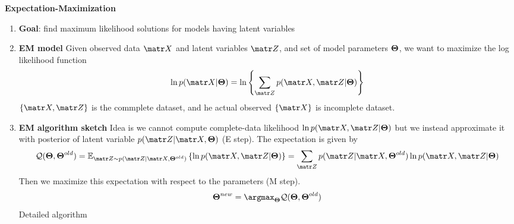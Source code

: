 \documentclass[11pt]{article}
\begin{document}

\begin{defn*}
    \textbf{Expectation-Maximization}
    \begin{enumerate}
        \item \textbf{Goal}: find maximum likelihood solutions for models having latent variables
        \item \textbf{EM model} Given observed data $\bX$ and latent variables $\bZ$, and set of model parameters $\boldsymbol{\Theta}$, we want to maximize the log likelihood function 
        \[
            \ln p(\bX | \bTheta) = 
            \ln \left\{ \sum_{\bZ} p(\bX, \bZ | \bTheta) \right\}    
        \]
        $\{\bX, \bZ\}$ is the commplete dataset, and he actual observed $\{\bX\}$ is incomplete dataset. 
        \item \textbf{EM algorithm sketch} Idea is we cannot compute complete-data likelihood $\ln p(\bX,\bZ | \bTheta)$ but we instead approximate it with posterior of latent variable $p(\bZ | \bX, \bTheta)$ (E step). The expectation is given by 
        \[
            \mathcal{Q}(\bTheta, \bTheta^{old})
            = \E[\bZ \sim p(\bZ | \bX,\bTheta^{old})]{\ln p(\bX, \bZ | \bTheta)}
            = \sum_{\bZ} p(\bZ | \bX, \bTheta^{old}) \ln p(\bX, \bZ | \bTheta)
        \]
        Then we maximize this expectation with respect to the parameters (M step).
        \[
            \bTheta^{new}
            = \argmax_{\bTheta}  \mathcal{Q}(\bTheta, \bTheta^{old})
        \]
        Detailed algorithm 
    \end{enumerate}
\end{defn*}
\end{document}
